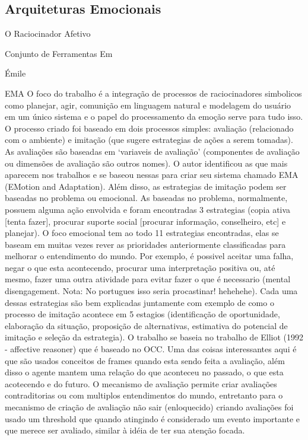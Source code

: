 \subsection{Arquiteturas Emocionais} %


{O Raciocinador Afetivo} %
\cite{elliott1992tar}

{Conjunto de Ferramentas Em} %

{Émile} %
\cite{gratch2000empitae}

{EMA} %
\cite{gratch2004domain}
O foco do trabalho é a integração de processos de raciocinadores simbolicos
como planejar, agir, comunição em linguagem natural e modelagem do usuário em
um único sistema e o papel do processamento da emoção serve para tudo isso. O
processo criado foi baseado em dois processos simples: avaliação (relacionado
com o ambiente) e imitação (que sugere estrategias de ações a serem tomadas).
As avaliações são baseadas em `variaveis de avaliação' (componentes de
avaliação ou dimensões de avaliação são outros nomes). O autor identificou as
que mais aparecem nos trabalhos e se baseou nessas para criar seu sistema
chamado EMA (EMotion and Adaptation).
%
Além disso, as estrategias de imitação podem ser baseadas no problema ou
emocional. As baseadas no problema, normalmente, possuem alguma ação envolvida
e foram encontradas 3 estrategias (copia ativa [tenta fazer], procurar suporte
social [procurar informação, conselheiro, etc] e planejar). O foco emocional
tem ao todo 11 estrategias encontradas, elas se baseam em muitas vezes rever
as prioridades anteriormente classificadas para melhorar o entendimento do
mundo. Por exemplo, é possivel aceitar uma falha, negar o que esta
acontecendo, procurar uma interpretação positiva ou, até mesmo, fazer uma
outra atividade para evitar fazer o que é necessario (mental disengagement.
Nota: No portugues isso seria procastinar! hehehehe).  Cada uma dessas
estrategias são bem explicadas juntamente com exemplo de como o processo de
imitação acontece em 5 estagios (identificação de oportunidade, elaboração da
situação, proposição de alternativas, estimativa do potencial de imitação e
seleção da estrategia). O trabalho se baseia no trabalho de Elliot (1992 -
affective reasoner) que é baseado no OCC. Uma das coisas interessantes aqui é
que são usados conceitos de frames quando esta sendo feita a avaliação, além
disso o agente mantem uma relação do que aconteceu no passado, o que esta
acotecendo e do futuro. O mecanismo de avaliação permite criar avaliações
contraditorias ou com multiplos entendimentos do mundo, entretanto para o
mecanismo de criação de avaliação não sair (enloquecido) criando avaliações
foi usado um threshold que quando atingindo é considerado um evento importante
e que merece ser avaliado, similar à idéia de ter sua atenção focada.


